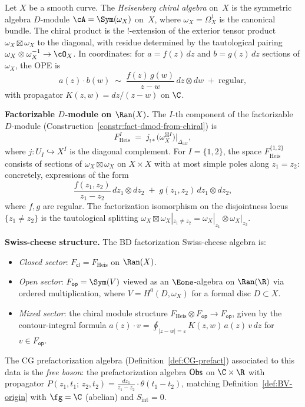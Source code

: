 \begin{example}
\label{ex:heisenberg-SC}

Let $X$ be a smooth curve. The \emph{Heisenberg chiral algebra} on~$X$
is the symmetric algebra $D$-module
$\cA = \Sym(\omega_X)$ on~$X$, where $\omega_X = \Omega^1_X$ is the
canonical bundle. The chiral product is the $!$-extension of
the exterior tensor product $\omega_X \boxtimes \omega_X$ to the
diagonal, with residue determined by the tautological pairing
$\omega_X \otimes \omega_X^{-1} \to \cO_X$. In coordinates: for
$a = f(z)\,dz$ and $b = g(z)\,dz$ sections of $\omega_X$, the OPE is
\begin{equation}\label{eq:heisenberg-OPE}
 a(z) \cdot b(w)
 \;\sim\;
 \frac{f(z)\,g(w)}{z - w}\, dz \otimes dw
 \;+\; \text{regular},
\end{equation}
with propagator $K(z,w) = dz/(z-w)$ on $\C$.

\smallskip\noindent
\textbf{Factorizable $D$-module on $\Ran(X)$.}
The $I$-th component of the factorizable $D$-module
(Construction~\ref{constr:fact-dmod-from-chiral}) is
\[
 F_{\mathrm{Heis}}^I
 \;=\;
 j_{!*}\bigl(\omega_X^{\boxtimes I}\bigr)
 \big|_{\Delta_{\mathrm{arr}}},
\]
where $j\colon U_I \hookrightarrow X^I$ is the diagonal complement.
For $I = \{1,2\}$, the space $F_{\mathrm{Heis}}^{\{1,2\}}$ consists
of sections of $\omega_X \boxtimes \omega_X$ on $X \times X$
with at most simple poles along $z_1 = z_2$: concretely, expressions
of the form
\[
 \frac{f(z_1,z_2)}{z_1 - z_2}\, dz_1 \otimes dz_2
 \;+\;
 g(z_1,z_2)\, dz_1 \otimes dz_2,
\]
where $f, g$ are regular. The factorization isomorphism on the
disjointness locus $\{z_1 \neq z_2\}$ is the tautological
splitting
$\omega_X \boxtimes \omega_X|_{z_1 \neq z_2} =
\omega_X|_{z_1} \otimes \omega_X|_{z_2}$.

\smallskip\noindent
\textbf{Swiss-cheese structure.}
The BD factorization Swiss-cheese algebra is:
\begin{itemize}
\item \emph{Closed sector}: $F_{\mathsf{cl}} = F_{\mathrm{Heis}}$
 on $\Ran(X)$.
\item \emph{Open sector}: $F_{\mathsf{op}} = \Sym(V)$ viewed as an
 $\Eone$-algebra on $\Ran(\R)$ via ordered multiplication, where
 $V = H^0(D, \omega_X)$ for a formal disc $D \subset X$.
\item \emph{Mixed sector}: the chiral module structure
 $F_{\mathrm{Heis}} \otimes F_{\mathsf{op}} \to F_{\mathsf{op}}$,
 given by the contour-integral formula
 $a(z) \cdot v = \oint_{|z-w|=\varepsilon}
 K(z,w)\, a(z)\, v\, dz$ for $v \in F_{\mathsf{op}}$.
\end{itemize}
The CG prefactorization algebra (Definition~\ref{def:CG-prefact})
associated to this data is the \emph{free boson}: the prefactorization
algebra $\mathsf{Obs}$ on $\C \times \R$ with propagator
$P(z_1,t_1;\,z_2,t_2) = \frac{dz_1}{z_1 - z_2}\cdot\theta(t_1 - t_2)$,
matching Definition~\ref{def:BV-origin} with $\fg = \C$ (abelian)
and $S_{\mathrm{int}} = 0$.
\end{example}

